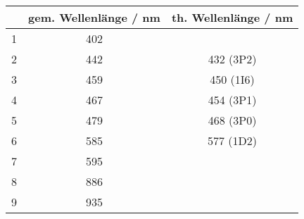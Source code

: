 \begin{center}
\begin{tabular}{|c|c|c|}
\hline
  & gem. Wellenlänge / nm & th. Wellenlänge / nm \\ \hline
1 & 402 &  \\ \hline
2 & 442 & 432 (3P2) \\ \hline
3 & 459 & 450 (1I6) \\ \hline
4 & 467 & 454 (3P1) \\ \hline
5 & 479 & 468 (3P0) \\ \hline
6 & 585 & 577 (1D2) \\ \hline
7 & 595 &  \\ \hline
8 & 886 &  \\ \hline
9 & 935 &  \\ \hline
\end{tabular}
\end{center}